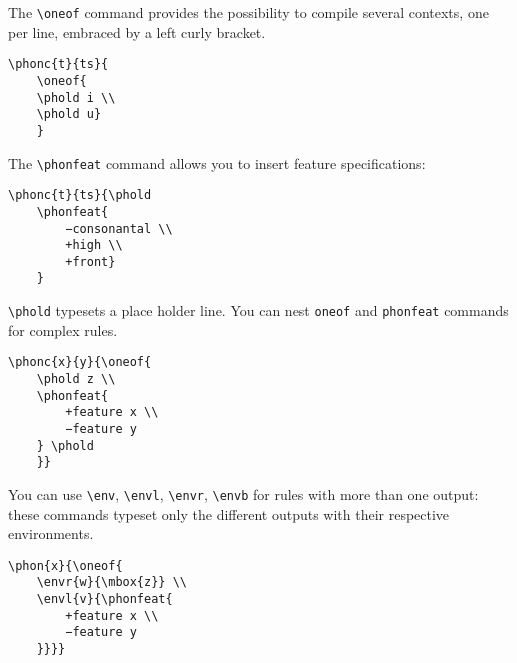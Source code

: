 \documentclass[a4paper]{article}
\begin{document}
The \verb+\oneof+ command provides the possibility to compile several contexts, one per line, embraced by a left curly bracket.

\begin{exe}
\ex
\begin{verbatim}
\phonc{t}{ts}{
	\oneof{
	\phold i \\
	\phold u}
	}
\end{verbatim}
\ex {}
\end{exe}

The \verb+\phonfeat+ command allows you to insert feature specifications:

\begin{exe}
\ex
\begin{verbatim}
\phonc{t}{ts}{\phold 
	\phonfeat{
		−consonantal \\
		+high \\
		+front}
	}
\end{verbatim}
\ex {}
\end{exe}

\verb+\phold+ typesets a place holder line. You can nest \verb|oneof| and \verb|phonfeat| commands for complex rules.

\begin{exe}
\ex
\begin{verbatim}
\phonc{x}{y}{\oneof{
	\phold z \\
	\phonfeat{
		+feature x \\
		−feature y
	} \phold
	}}
\end{verbatim}
\ex {}
\end{exe}

You can use \verb|\env|, \verb|\envl|, \verb|\envr|, \verb|\envb| for rules with more than one output: these commands typeset only the different outputs with their respective environments.

\begin{exe}
\ex
\begin{verbatim}
\phon{x}{\oneof{
	\envr{w}{\mbox{z}} \\
	\envl{v}{\phonfeat{
		+feature x \\
		−feature y
	}}}}
\end{verbatim}
\ex {}
\end{exe}
\end{document}
